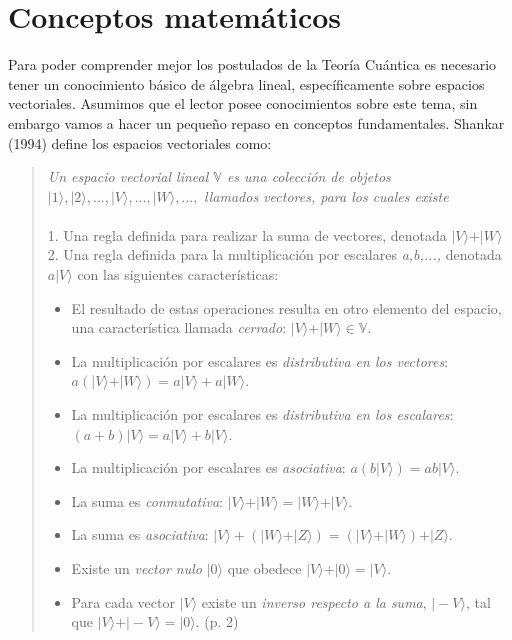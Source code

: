 \documentclass[11pt,a4paper]{article}
\begin{document}
\section*{Conceptos matemáticos}
 Para poder comprender mejor los postulados de la Teoría Cuántica es necesario tener un conocimiento básico de álgebra lineal, específicamente sobre espacios vectoriales. Asumimos que el lector posee conocimientos sobre este tema, sin embargo vamos a hacer un pequeño repaso en conceptos fundamentales. 
Shankar (1994) define los espacios vectoriales como:

\begin{quote}
\textit{Un espacio vectorial lineal $\mathbb{V}$ es una colección de objetos} $\vert1\rangle,\vert2\rangle,...,\vert V\rangle,...,\vert W\rangle,...,$ \textit{llamados vectores, para los cuales existe}
\\\\
1. Una regla definida para realizar la suma de vectores, denotada $\vert V\rangle+\vert W\rangle$
\\2. Una regla definida para la multiplicación por escalares \textit{a,b,...,} denotada $a\vert V\rangle$ con las siguientes características:
\\
\begin{itemize}
\item El resultado de estas operaciones resulta en otro elemento del espacio, una característica llamada \textit{cerrado}: $\vert V\rangle+ \vert W\rangle\in\mathbb{V}$.
\item La multiplicación por escalares es \textit{distributiva en los vectores}: $a(\vert V\rangle+\vert W\rangle)=a\vert V\rangle+a\vert W\rangle$.
\item La multiplicación por escalares es \textit{distributiva en los escalares}: $(a+b)\vert V\rangle=a\vert V\rangle+b\vert V\rangle$.
\item La multiplicación por escalares es \textit{asociativa}: $a(b\vert V\rangle)=ab\vert V\rangle$.
\item La suma es \textit{conmutativa}: $\vert V\rangle+\vert W\rangle=\vert W\rangle+\vert V\rangle$.
\item La suma es \textit{asociativa}: $\vert V\rangle+(\vert W\rangle+\vert Z\rangle)=(\vert V\rangle+\vert W\rangle)+\vert Z\rangle$.
\item Existe un \textit{vector nulo} $\vert 0\rangle$ que obedece $\vert V\rangle+\vert 0\rangle=\vert V\rangle$.
\item Para cada vector $\vert V\rangle$ existe un \textit{inverso respecto a la suma}, $\vert -V\rangle$, tal que $\vert V\rangle+\vert -V\rangle=\vert 0\rangle$. (p. 2)
\end{itemize}
\end{quote}
\end{document}
